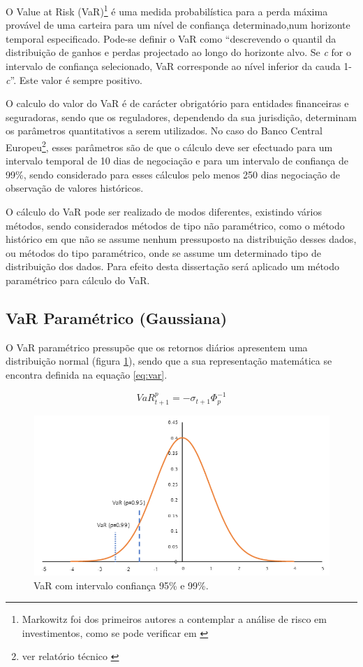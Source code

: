 \documentclass[
  12pt,
  a4paper,
  openany]{book}
\begin{document}
O Value at Risk (VaR)\footnote{Markowitz foi dos primeiros autores a contemplar a análise de risco em investimentos, como se pode verificar em \citet{Markowitz1952}} é uma medida probabilística para a perda máxima provável de uma carteira para um nível de confiança determinado,num horizonte temporal especificado. Pode-se definir o VaR como ``descrevendo o quantil da distribuição de ganhos e perdas projectado ao longo do horizonte alvo. Se \emph{c} for o intervalo de confiança selecionado, VaR corresponde ao nível inferior da cauda 1-\emph{c}''\citep[pp.17]{philippe}. Este valor é sempre positivo.

O calculo do valor do VaR é de carácter obrigatório para entidades financeiras e seguradoras, sendo que os reguladores, dependendo da sua jurisdição, determinam os parâmetros quantitativos a serem utilizados.
No caso do Banco Central Europeu\footnote{ver relatório técnico \citet{ecb}}, esses parâmetros são de que o cálculo deve ser efectuado para um intervalo temporal de 10 dias de negociação e para um intervalo de confiança de 99\%, sendo considerado para esses cálculos pelo menos 250 dias negociação de observação de valores históricos.

O cálculo do VaR pode ser realizado de modos diferentes, existindo vários métodos, sendo considerados métodos de tipo não paramétrico, como o método histórico em que não se assume nenhum pressuposto na distribuição desses dados, ou métodos do tipo paramétrico, onde se assume um determinado tipo de distribuição dos dados. Para efeito desta dissertação será aplicado um método paramétrico para cálculo do VaR.

\hypertarget{var-paramuxe9trico-gaussiana}{%
\subsection{VaR Paramétrico (Gaussiana)}\label{var-paramuxe9trico-gaussiana}}

O VaR paramétrico pressupõe que os retornos diários apresentem uma distribuição normal (figura \ref{fig:var}), sendo que a sua representação matemática se encontra definida na equação \eqref{eq:var}.

\begin{equation} 
  VaR_{t+1}^{p} = -\sigma_{t+1}\Phi_{p}^{-1}
  \label{eq:var}
\end{equation}


\begin{figure}

{\centering \includegraphics[width=0.6\linewidth]{image/VaR} 

}

\caption{VaR com intervalo confiança 95\% e 99\%.}\label{fig:var}
\end{figure}
\FloatBarrier
\centering
\end{document}
